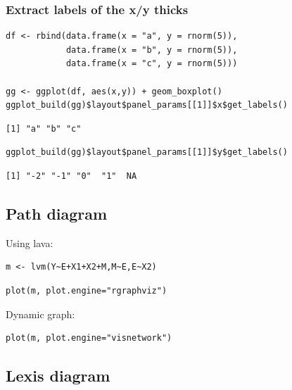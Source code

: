 \documentclass{article}
\begin{document}
\subsubsection{Extract labels of the x/y thicks}
\label{sec:org5fc3751}

\lstset{language=r,label= ,caption= ,captionpos=b,numbers=none}
\begin{lstlisting}
df <- rbind(data.frame(x = "a", y = rnorm(5)),
            data.frame(x = "b", y = rnorm(5)),
            data.frame(x = "c", y = rnorm(5)))

gg <- ggplot(df, aes(x,y)) + geom_boxplot()
ggplot_build(gg)$layout$panel_params[[1]]$x$get_labels()
\end{lstlisting}

\begin{verbatim}
[1] "a" "b" "c"
\end{verbatim}


\lstset{language=r,label= ,caption= ,captionpos=b,numbers=none}
\begin{lstlisting}
ggplot_build(gg)$layout$panel_params[[1]]$y$get_labels()
\end{lstlisting}

\begin{verbatim}
[1] "-2" "-1" "0"  "1"  NA
\end{verbatim}


\clearpage

\subsection{Path diagram}
\label{sec:orga8765d3}
Using lava:
\lstset{language=r,label= ,caption= ,captionpos=b,numbers=none}
\begin{lstlisting}
m <- lvm(Y~E+X1+X2+M,M~E,E~X2)
\end{lstlisting}

\lstset{language=r,label= ,caption= ,captionpos=b,numbers=none}
\begin{lstlisting}
plot(m, plot.engine="rgraphviz") 
\end{lstlisting}

Dynamic graph:
\lstset{language=r,label= ,caption= ,captionpos=b,numbers=none}
\begin{lstlisting}
plot(m, plot.engine="visnetwork")
\end{lstlisting}
\subsection{Lexis diagram}
\label{sec:org9504bce}
\end{document}
